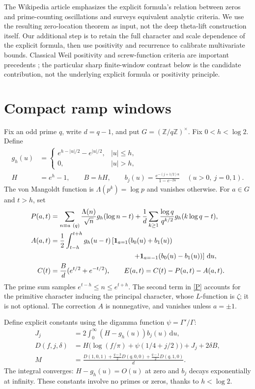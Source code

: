 \documentclass[11pt]{article}
\newcommand{\one}{\mathbf 1}
\newcommand{\dd}{\,\mathrm d}
\begin{document}
The Wikipedia article emphasizes the explicit formula's relation between zeros and prime-counting oscillations and surveys equivalent analytic criteria. We use the resulting zero-location theorem as input, not the deep theta-lift construction itself. Our additional step is to retain the full character and scale dependence of the explicit formula, then use positivity and recurrence to calibrate multivariate bounds. Classical Weil positivity and screw-function criteria are important precedents \cite{cohen,suzuki,dfm}; the particular sharp finite-window contrast below is the candidate contribution, not the underlying explicit formula or positivity principle.

\section{Compact ramp windows}
Fix an odd prime $q$, write $d=q-1$, and put $G=(\mathbb Z/q\mathbb Z)^\times$. Fix $0<h<\log 2$. Define
\begin{align*}
 g_h(u)&=\begin{cases}e^{h-|u|/2}-e^{|u|/2},&|u|\le h,\\0,&|u|>h,\end{cases}\\
 H&=e^h-1,\qquad B=hH,\qquad
 b_j(u)=\frac{e^{-(j+1/2)u}}{1-e^{-2u}}\quad (u>0,\ j=0,1).
\end{align*}
The von Mangoldt function is $\Lambda(p^k)=\log p$ and vanishes otherwise. For $a\in G$ and $t>h$, set
\begin{align}
 P(a,t)&=\sum_{n\equiv a\ (q)}\frac{\Lambda(n)}{\sqrt n}g_h(\log n-t)
 +\frac1d\sum_{k\ge1}\frac{\log q}{q^{k/2}}g_h(k\log q-t),\label{P}\\
 A(a,t)&=\frac12\int_{t-h}^{t+h}g_h(u-t)\left[\one_{a=1}(b_0(u)+b_1(u))\right.\notag\\
 &\hspace{42mm}\left.+\one_{a=-1}(b_0(u)-b_1(u))\right]\dd u,\\
 C(t)&=\frac Bd(e^{t/2}+e^{-t/2}),\qquad E(a,t)=C(t)-P(a,t)-A(a,t).\label{E}
\end{align}
The prime sum samples $e^{t-h}\le n\le e^{t+h}$. The second term in \eqref{P} accounts for the primitive character inducing the principal character, whose $L$-function is $\zeta$; it is not optional. The correction $A$ is nonnegative, and vanishes unless $a=\pm1$.

Define explicit constants using the digamma function $\psi=\Gamma'/\Gamma$:
\begin{align*}
 J_j&=2\int_0^\infty(H-g_h(u))b_j(u)\dd u,\\
 D(f,j,\delta)&=H\bigl(\log(f/\pi)+\psi(1/4+j/2)\bigr)+J_j+2\delta B,\\
 M&=\frac{D(1,0,1)+\frac{q-3}{2}D(q,0,0)+\frac{q-1}{2}D(q,1,0)}{d}.
\end{align*}
The integral converges: $H-g_h(u)=O(u)$ at zero and $b_j$ decays exponentially at infinity. These constants involve no primes or zeros, thanks to $h<\log 2$.
\end{document}
